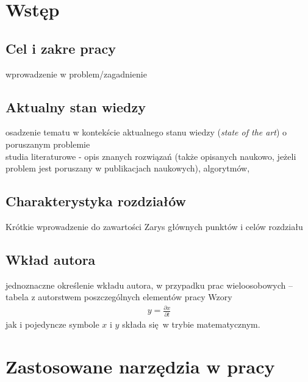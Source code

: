 \documentclass[a4paper,twoside,12pt]{book}
\newcommand{\obcy}[1]{\emph{#1}}
\newcommand{\english}[1]{{\selectlanguage{british}\obcy{#1}}}
\newcounter{stronyPozaNumeracja}
\begin{document}
\tableofcontents

\setcounter{stronyPozaNumeracja}{\value{page}}
\mainmatter
\pagestyle{empty}

\cleardoublepage

\pagestyle{NumeryStronNazwyRozdzialow}


\chapter{Wstęp}
\label{ch:wstep}
\section{Cel i zakre pracy}
wprowadzenie w problem/zagadnienie
\section{Aktualny stan wiedzy}
osadzenie tematu w kontekście aktualnego stanu wiedzy (\english{state of the art}) o poruszanym problemie\\
studia literaturowe \cite{bib:artykul,bib:ksiazka,bib:konferencja,bib:internet} -  opis znanych rozwiązań (także opisanych naukowo, jeżeli problem jest poruszany w publikacjach naukowych), algorytmów,
\section{Charakterystyka rozdziałów}
Krótkie wprowadzenie do zawartości
Zarys głównych punktów i celów rozdziału

\section{Wkład autora}
jednoznaczne określenie wkładu autora, w przypadku prac wieloosobowych – tabela z autorstwem poszczególnych elementów pracy
Wzory
\begin{align}
	y = \frac{\partial x}{\partial t}
\end{align}
jak i pojedyncze symbole $x$ i $y$  składa się w trybie matematycznym.



\chapter{Zastosowane narzędzia w pracy}
\label{ch:wymagania-i-narzedzia}
\end{document}
